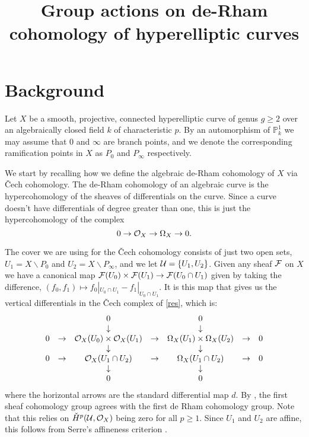 \documentclass[draft, 11pt]{article} %
\title{Group actions on de-Rham cohomology of hyperelliptic curves}
\author{}
\theoremstyle{plain}
\theoremstyle{remark}
\newcommand{\cO}{{\cal O}}
\newcommand{\cech}{\v{C}ech }
\begin{document}
\maketitle

\section{Background}


Let $X$ be a smooth, projective, connected hyperelliptic curve of genus $g \geq 2$ over an algebraically closed field $k$ of characteristic $p$.
By an automorphism of $ \mathbb P_k^1$ we may assume that 0 and $\infty$ are branch points, and we denote the corresponding ramification points in $X$ as $P_0$ and $P_\infty$ respectively.

We start by recalling how we define the algebraic de-Rham cohomology of $X$ via \cech cohomology.
The de-Rham cohomology of an algebraic curve is the hypercohomology of the sheaves of differentials on the curve. Since a curve doesn't have differentials of degree greater than one, this is just the hypercohomology of the complex
\begin{equation}\label{res}
0 \rightarrow \cO_X \rightarrow \Omega_X \rightarrow 0.
\end{equation}

The cover we are using for the \cech cohomology consists of just two open sets, $U_1 = X\backslash P_0$ and $U_2 = X\backslash P_\infty$, and we let ${\cal U} = \{ U_1, U_2\}$.
Given any sheaf $\cal F$ on $X$ we have a canonical map ${\cal F}(U_0) \times {\cal F} (U_1) \rightarrow {\cal F}(U_0 \cap U_1)$ given by taking the difference, $(f_0,f_1) \mapsto f_0|_{U_0 \cap U_1} - f_1|_{U_0 \cap U_1}$.
It is this map that gives us the vertical differentials in the \cech complex of \ref{res}, which is:
\[ \begin{array}{ccccccc}
~ & ~ & 0 & ~ & 0 & ~ & ~ \\
~ & ~ & \downarrow & ~ & \downarrow & ~ & ~ \\
0 & \rightarrow & \cO_X(U_0)\times \cO_X(U_1) & \rightarrow & \Omega_X(U_1)\times \Omega_X(U_2) & \rightarrow & 0 \\
~ & ~ & \downarrow & ~ & \downarrow & ~ & ~ \\
0 & \rightarrow & \cO_X(U_1 \cap U_2) & \rightarrow & \Omega_X(U_1 \cap U_2) & \rightarrow & 0 \\
~ & ~ & \downarrow & ~ & \downarrow & ~ & ~ \\
~ & ~ & 0 & ~ & 0 & ~ & ~ \\
\end{array}
\]
where the horizontal arrows are the standard differential map $d$.
By \cite[Cor. 12.4.7]{EGA0III}, the first sheaf cohomology group agrees with the first de Rham cohomology group.
Note that this relies on ${\check H}^p({\mathcal U},\cO_X) $ being zero for all $p\geq 1$.
Since $U_1$ and $U_2$ are affine, this follows from Serre's affineness criterion \cite[Thm 5.2.23]{liu}.
\end{document}
